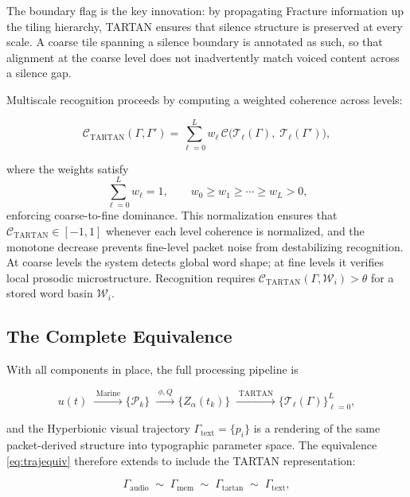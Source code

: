 \documentclass[12pt, a4paper]{article}
\begin{document}
The boundary flag is the key innovation: by propagating Fracture information up the tiling hierarchy, TARTAN ensures that silence structure is preserved at every scale. A coarse tile spanning a silence boundary is annotated as such, so that alignment at the coarse level does not inadvertently match voiced content across a silence gap.

Multiscale recognition proceeds by computing a weighted coherence across levels:

\begin{equation}
\mathcal{C}_{\mathrm{TARTAN}}(\Gamma, \Gamma') = \sum_{\ell=0}^{L} w_\ell\, \mathcal{C}\bigl(\mathcal{T}_\ell(\Gamma),\; \mathcal{T}_\ell(\Gamma')\bigr),
\label{eq:Ctartan}
\end{equation}

where the weights satisfy
\begin{equation}
\sum_{\ell=0}^{L} w_\ell = 1, \qquad w_0 \geq w_1 \geq \cdots \geq w_L > 0,
\label{eq:tartanweights}
\end{equation}
enforcing coarse-to-fine dominance. This normalization ensures that $\mathcal{C}_{\mathrm{TARTAN}} \in [-1, 1]$ whenever each level coherence is normalized, and the monotone decrease prevents fine-level packet noise from destabilizing recognition. At coarse levels the system detects global word shape; at fine levels it verifies local prosodic microstructure. Recognition requires $\mathcal{C}_{\mathrm{TARTAN}}(\Gamma, \mathcal{W}_i) > \theta$ for a stored word basin $\mathcal{W}_i$.

\subsection{The Complete Equivalence}

With all components in place, the full processing pipeline is

\begin{equation}
u(t)
\;\xrightarrow{\;\text{Marine}\;}
\{\mathcal{P}_k\}
\;\xrightarrow{\;\phi, Q\;}
\{Z_\alpha(t_k)\}
\;\xrightarrow{\;\text{TARTAN}\;}
\{\mathcal{T}_\ell(\Gamma)\}_{\ell=0}^{L},
\label{eq:pipeline}
\end{equation}

and the Hyperbionic visual trajectory $\Gamma_{\mathrm{text}} = \{p_i\}$ is a rendering of the same packet-derived structure into typographic parameter space. The equivalence \eqref{eq:trajequiv} therefore extends to include the TARTAN representation:

\begin{equation}
\Gamma_{\mathrm{audio}} \;\sim\; \Gamma_{\mathrm{mem}} \;\sim\; \Gamma_{\mathrm{tartan}} \;\sim\; \Gamma_{\mathrm{text}},
\label{eq:fullequiv}
\end{equation}
\end{document}
